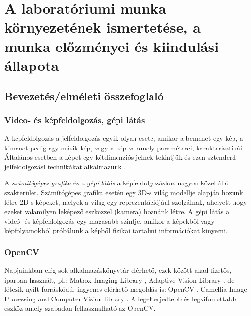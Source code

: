 \documentclass[a4paper,oneside]{article}
\begin{document}
\section{A laboratóriumi munka környezetének ismertetése, a munka előzményei és kiindulási állapota}
\label{sec:bevezeto}
\subsection{Bevezetés/elméleti összefoglaló}
\label{sec:bevez-ossz}

\subsubsection{Video- és képfeldolgozás, gépi látás}

A képfeldolgozás a jelfeldolgozás egyik olyan esete, amikor a bemenet egy kép, a kimenet pedig egy másik kép, vagy a kép valamely paraméterei, karakterisztikái. Általános esetben a képet egy kétdimenziós jelnek tekintjük és ezen  sztenderd jelfeldolgozási technikákat alkalmazunk \cite{wiki:image-processing}.

A \textit{számítógépes grafika} és a \textit{gépi látás} a képfeldolgozáshoz nagyon közel álló szakterület. Számítógépes grafika esetén egy 3D-s világ modellje alapján hozunk létre 2D-s képeket, melyek a világ egy reprezentációjául szolgálnak, ahelyett hogy ezeket valamilyen leképező eszközzel (kamera) hoznánk létre. A gépi látás a videó- és képfeldolgozás egy magasabb szintje, amikor a képekből vagy képfolyamokból próbálunk a képből fizikai tartalmi információkat kinyerni.

\subsubsection{OpenCV}

Napjainkban elég sok alkalmazáskönyvtár elérhető, ezek között akad fizetős, iparban használt, pl.: Matrox Imaging Library \cite{matrox}, Adaptive Vision Library \cite{adaptive-vision}, de létezik nyílt forráskódú, ingyenes elérhető megoldás is: OpenCV \cite{opencv}, Camellia Image Processing and Computer Vision library \cite{camellia}. A legelterjedtebb és legkiforrottabb eszköz amely szabadon felhasználható az OpenCV. %
\end{document}
